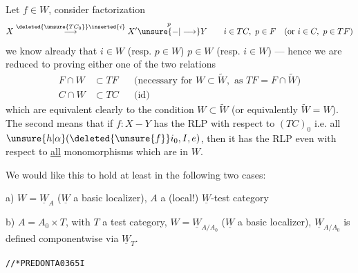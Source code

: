 Let $f\in W$, consider factorization
\[
X\overset{\deleted{\unsure{TC_0}}\inserted{i}}{\longrightarrow}X'\overset{p}{\unsure{-|\longrightarrow}}Y\qquad i\in TC,\ p\in F\quad(\text{or }i\in C,\ p\in TF)
\]
we know already that $i\in W$ (resp. $p\in W$)  $p\in W$ (resp. $i\in W$) --- hence we are reduced to  proving either one of the two relations
\[
\begin{aligned}
F\cap W&\subset TF&&\text{(necessary for }W\subset\widetilde W,\text{ as }TF=F\cap\widetilde W)\\
C\cap W&\subset TC&&\text{(id)}
\end{aligned}
\]
which are  equivalent  clearly to the condition $W\subset\widetilde W$ (or equivalently  $\widetilde W=W$). The second \inserted{[first!]} means that if $f:X-Y$ \inserted{[is in $W$ and]} has the  RLP with respect to $(TC)_0$ i.e. all  $\unsure{h|\alpha}(\deleted{\unsure{f}}i_0,I,e)$, then it has the RLP even with respect to \uline{all} monomorphisms which are in $W$.
\margin{[????]}

We would like this to hold at least in the following two cases:


a) $W=\underline W_A$ ($\underline W$ a basic localizer), $A$ a (local!) $\underline W$-test category

b) $A=A_0\times T$,  with $T$ a test category, $W=\underline W_{A/A_0}$ ($\underline W$ a basic localizer), $\underline W_{A/A_0}$ is defined componentwise via $\underline W_T$.

\texttt{//*\phantom{000}PREDONTA0365\phantom{00000000}I}


